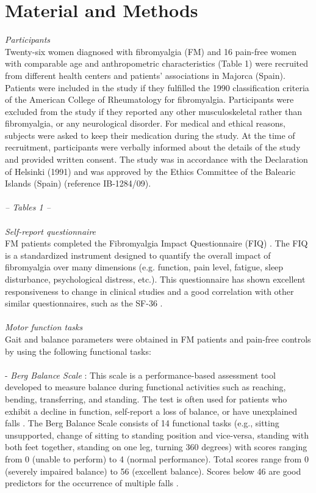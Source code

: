 \documentclass[12pt]{article}
\begin{document}
\section*{Material and Methods}
\emph{Participants}\\
Twenty-six women diagnosed with fibromyalgia (FM) and 16 pain-free women with comparable age and anthropometric characteristics (Table 1) were recruited from different health centers and patients' associations in Majorca (Spain). Patients were included in the study if they fulfilled the 1990 classification criteria of the American College of Rheumatology for fibromyalgia. Participants were excluded from the study if they reported any other musculoskeletal rather than fibromyalgia, or any neurological disorder. For medical and ethical reasons, subjects were asked to keep their medication during the study. At the time of recruitment, participants were verbally informed about the details of the study and provided written consent. The study was in accordance with the Declaration of Helsinki (1991) and was approved by the Ethics Committee of the Balearic Islands (Spain) (reference IB-1284/09).\\
\\
\emph{-- Tables 1 --}\\
\\
\emph{Self-report questionnaire}\\
FM patients completed the Fibromyalgia Impact Questionnaire (FIQ) \cite{burckhardt1991fibromyalgia}. The FIQ is a standardized instrument designed to quantify the overall impact of fibromyalgia over many dimensions (e.g. function, pain level, fatigue, sleep disturbance, psychological distress, etc.). This questionnaire has shown excellent responsiveness to change in clinical studies and a good correlation with other similar questionnaires, such as the SF-36 \cite{bennett2005fibromyalgia}.\\
\\
\emph{Motor function tasks}\\
Gait and balance parameters were obtained in FM patients and pain-free controls by using the following functional tasks:\\ 
\\
- \emph{Berg Balance Scale} \cite{berg1991measuring}: This scale is a performance-based assessment tool developed to measure balance during functional activities such as reaching, bending, transferring, and standing. The test is often used for patients who exhibit a decline in function, self-report a loss of balance, or have unexplained falls \cite{berg1991measuring}. The Berg Balance Scale consists of 14 functional tasks (e.g., sitting unsupported, change of sitting to standing position and vice-versa, standing with both feet together, standing on one leg, turning 360 degrees) with scores ranging from 0 (unable to perform) to 4 (normal performance). Total scores range from 0 (severely impaired balance) to 56 (excellent balance). Scores below 46 are good predictors for the occurrence of multiple falls \cite{dibble2008diagnosis}.\\
\end{document}
